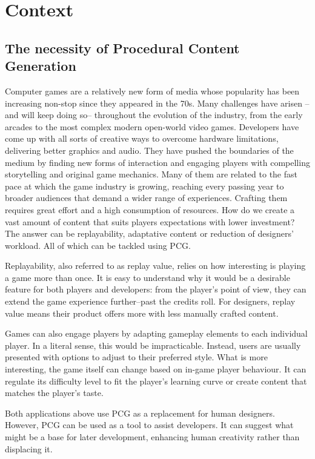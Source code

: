 \chapter{Context}\label{ch:context}
\section{The necessity of Procedural Content Generation}
Computer games are a relatively new form of media whose popularity has been increasing non-stop since they appeared in the 70s. Many challenges have arisen --and will keep doing so-- throughout the evolution of the industry, from the early arcades to the most complex modern open-world video games. Developers have come up with all sorts of creative ways to overcome hardware limitations, delivering better graphics and audio. They have pushed the boundaries of the medium by finding new forms of interaction and engaging players with compelling storytelling and original game mechanics. Many of them are related to the fast pace at which the game industry is growing, reaching every passing year to broader audiences that demand a wider range of experiences. Crafting them requires great effort and a high consumption of resources. How do we create a vast amount of content that suits players expectations with lower investment? The answer can be replayability, adaptative content or reduction of designers' workload. All of which can be tackled using \acf{PCG}.\cite{togelius2016introduction}

Replayability, also referred to as replay value, relies on how interesting is playing a game more than once. It is easy to understand why it would be a desirable feature for both players and developers: from the player's point of view, they can extend the game experience further--past the credits roll. For designers, replay value means their product offers more with less manually crafted content.

Games can also engage players by adapting gameplay elements to each individual player.  In a literal sense, this would be impracticable. Instead, users are usually presented with options to adjust to their preferred style. What is more interesting, the game itself can change based on in-game player behaviour. It can regulate its difficulty level to fit the player's learning curve or create content that matches the player's taste.

Both applications above use \ac{PCG} as a replacement for human designers. However, \ac{PCG} can be used as a tool to assist developers. It can suggest what might be a base for later development, enhancing human creativity rather than displacing it. 

